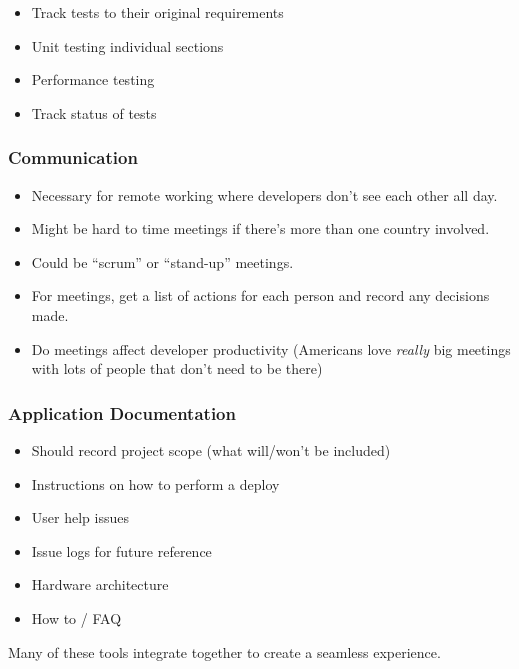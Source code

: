 \begin{itemize}
	\item Track tests to their original requirements
	\item Unit testing individual sections
	\item Performance testing
	\item Track status of tests
\end{itemize}

\subsubsection{Communication}\label{ssub:communication}

\begin{itemize}
	\item Necessary for remote working where developers don't see each other all day.
	\item Might be hard to time meetings if there's more than one country involved.
	\item Could be ``scrum'' or ``stand-up'' meetings.
	\item For meetings, get a list of actions for each person and record any decisions made.
	\item Do meetings affect developer productivity (Americans love \emph{really} big meetings with lots of people that don't need to be there)
\end{itemize}

\subsubsection{Application Documentation}\label{ssub:application_documentation}

\begin{itemize}
	\item Should record project scope (what will/won't be included)
	\item Instructions on how to perform a deploy
	\item User help issues
	\item Issue logs for future reference
	\item Hardware architecture
	\item How to / FAQ
\end{itemize}

\begin{note}
	Many of these tools integrate together to create a seamless experience.
\end{note}
